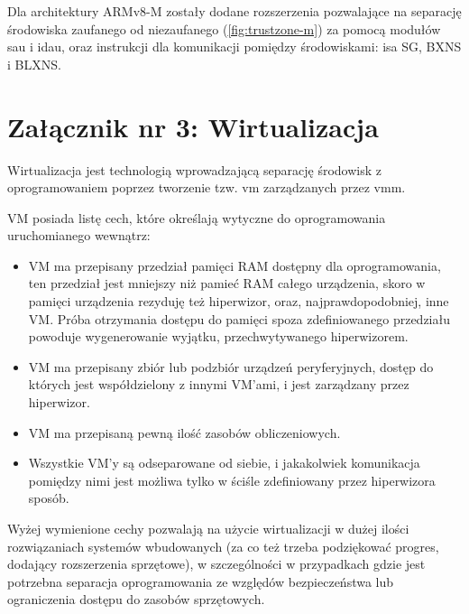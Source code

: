 \documentclass[../main]{subfiles}
\begin{document}
Dla architektury ARMv8-M zostały dodane rozszerzenia pozwalające na separację środowiska zaufanego od
niezaufanego (\cref{fig:trustzone-m}) za pomocą modułów \acrshort{sau} i \acrshort{idau},
oraz instrukcji dla komunikacji pomiędzy środowiskami: \acrshort{isa} SG, BXNS i BLXNS.
\cite{trustzonearmv8m}

\section*{Załącznik nr 3: Wirtualizacja}\label{sec:zalacznik-3}

Wirtualizacja jest technologią wprowadzającą separację środowisk z oprogramowaniem poprzez tworzenie tzw. \acrshort{vm} zarządzanych przez \acrshort{vmm}.

VM posiada listę cech, które określają wytyczne do oprogramowania uruchomianego wewnątrz:
\begin{itemize}
    \item VM ma przepisany przedział pamięci RAM dostępny dla oprogramowania, ten przedział jest
    mniejszy niż pamieć RAM całego urządzenia, skoro w pamięci urządzenia rezyduję też hiperwizor,
    oraz, najprawdopodobniej, inne VM. Próba otrzymania dostępu do pamięci spoza zdefiniowanego
    przedziału powoduje wygenerowanie wyjątku, przechwytywanego hiperwizorem.
    \item VM ma przepisany zbiór lub podzbiór urządzeń peryferyjnych, dostęp do których jest
    współdzielony z innymi VM'ami, i jest zarządzany przez hiperwizor.
    \item VM ma przepisaną pewną ilość zasobów obliczeniowych.
    \item Wszystkie VM'y są odseparowane od siebie, i jakakolwiek komunikacja pomiędzy nimi jest
    możliwa tylko w ściśle zdefiniowany przez hiperwizora sposób.
\end{itemize}

Wyżej wymienione cechy pozwalają na użycie wirtualizacji w dużej ilości rozwiązaniach systemów
wbudowanych (za co też trzeba podziękować progres, dodający rozszerzenia sprzętowe), w szczególności w
przypadkach gdzie jest potrzebna separacja oprogramowania ze względów bezpieczeństwa lub ograniczenia
dostępu do zasobów sprzętowych.
\end{document}

